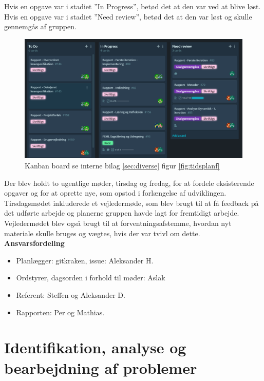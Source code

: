 Hvis en opgave var i stadiet ”In Progress”, betød det at den var ved at blive løst.\\
Hvis en opgave var i stadiet ”Need review”, betød det at den var løst og skulle gennemgås af gruppen.\\
\begin{figure}[h]
\includegraphics[width = \linewidth]{./PNG/proces/kanban.png}
\caption{Kanban board se interne bilag \ref{sec:diverse} figur \ref{fig:tidsplanf}}
\label{fig:kanban}
\end{figure}
Der blev holdt to ugentlige møder, tirsdag og fredag, for at fordele eksisterende opgaver og for at oprette nye, som opstod i forlængelse af udviklingen. Tirsdagsmødet inkluderede et vejledermøde, som blev brugt til at få feedback på det udførte arbejde og planerne gruppen havde lagt for fremtidigt arbejde. Vejledermødet blev også brugt til at forventningsafstemme, hvordan nyt materiale skulle bruges og vægtes, hvis der var tvivl om dette.\\
\textbf{Ansvarsfordeling}
\begin{itemize}
\item Planlægger: gitkraken, issue: Aleksander H. 
\item Ordstyrer, dagsorden i forhold til møder: Aslak 
\item Referent: Steffen og Aleksander D. 
\item Rapporten: Per og Mathias. 
\end{itemize}
\newpage
\section{Identifikation, analyse og bearbejdning af problemer}
